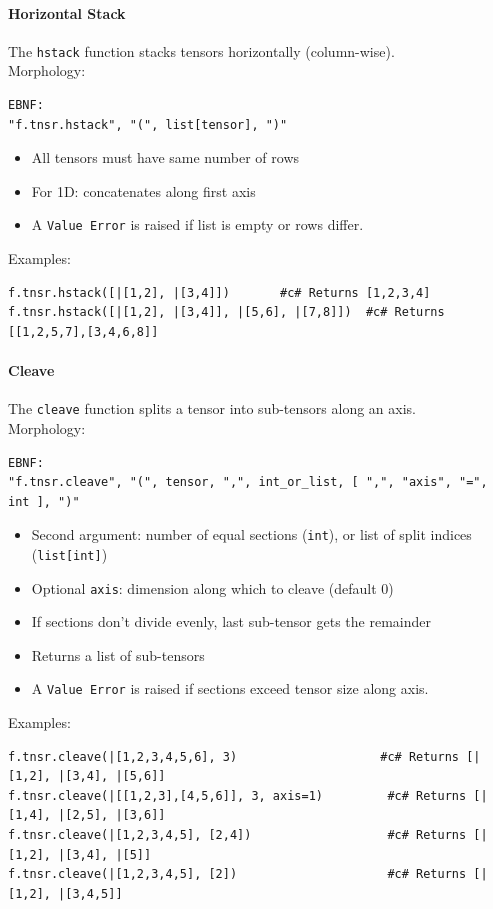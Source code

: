 \paragraph{Horizontal Stack}
The \texttt{hstack} function stacks tensors horizontally (column-wise).\\
Morphology:
\begin{verbatim}
EBNF:
"f.tnsr.hstack", "(", list[tensor], ")"
\end{verbatim}
\begin{itemize}
\item All tensors must have same number of rows
\item For 1D: concatenates along first axis
\item A \texttt{Value Error} is raised if list is empty or rows differ.
\end{itemize}
Examples:
\begin{verbatim}
f.tnsr.hstack([|[1,2], |[3,4]])       #c# Returns [1,2,3,4]
f.tnsr.hstack([|[1,2], |[3,4]], |[5,6], |[7,8]])  #c# Returns [[1,2,5,7],[3,4,6,8]]
\end{verbatim}

\paragraph{Cleave}
The \texttt{cleave} function splits a tensor into sub-tensors along an axis.\\
Morphology:
\begin{verbatim}
EBNF:
"f.tnsr.cleave", "(", tensor, ",", int_or_list, [ ",", "axis", "=", int ], ")"
\end{verbatim}
\begin{itemize}
\item Second argument: number of equal sections (\texttt{int}), or list of split indices (\texttt{list[int]})
\item Optional \texttt{axis}: dimension along which to cleave (default 0)
\item If sections don't divide evenly, last sub-tensor gets the remainder
\item Returns a list of sub-tensors
\item A \texttt{Value Error} is raised if sections exceed tensor size along axis.
\end{itemize}
Examples:
\begin{verbatim}
f.tnsr.cleave(|[1,2,3,4,5,6], 3)                    #c# Returns [|[1,2], |[3,4], |[5,6]]
f.tnsr.cleave(|[[1,2,3],[4,5,6]], 3, axis=1)         #c# Returns [|[1,4], |[2,5], |[3,6]]
f.tnsr.cleave(|[1,2,3,4,5], [2,4])                   #c# Returns [|[1,2], |[3,4], |[5]]
f.tnsr.cleave(|[1,2,3,4,5], [2])                     #c# Returns [|[1,2], |[3,4,5]]
\end{verbatim}

